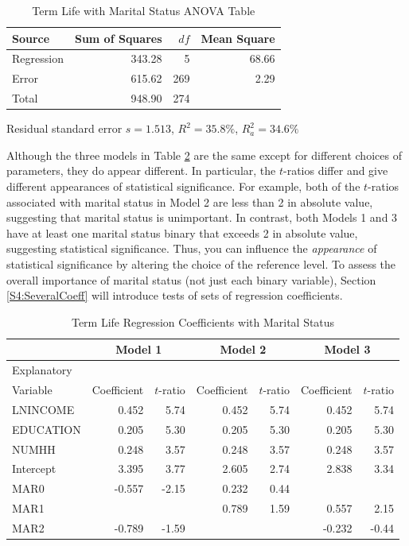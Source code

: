 
\begin{table}[h]
 \caption{\label{T4:MSTermLifeANOVA} Term Life with
Marital Status ANOVA Table}
\begin{tabular}{lrrr}
 \hline Source
& Sum of Squares & $df$ & Mean Square \\ \hline

Regression & 343.28 & 5 &   68.66 \\
Error      & 615.62 & 269 &  2.29 \\
Total      & 948.90& 274 &   \\ \hline
\end{tabular}

Residual standard error $s= 1.513$, $R^2 = 35.8\%$, $R_a^2 = 34.6\%$
\end{table}


Although the three models in Table \ref{T4:MSTermLifeRegrCoeff} are
the same except for different choices of parameters, they do appear
different. In particular, the $t$-ratios differ and give different
appearances of statistical significance. For example, both of the
$t$-ratios associated with marital status in Model 2 are less than 2
in absolute value, suggesting that marital status is unimportant. In
contrast, both Models 1 and 3 have at least one marital status
binary that exceeds 2 in absolute value, suggesting statistical
significance. Thus, you can influence the \emph{appearance} of
statistical significance by altering the choice of the reference
level. To assess the overall importance of marital status (not just
each binary variable), Section \ref{S4:SeveralCoeff} will introduce
tests of sets of regression coefficients.



\begin{table}
 \caption{\label{T4:MSTermLifeRegrCoeff} Term Life
Regression Coefficients with Marital Status}
\begin{tabular}{l|rr|rr|rr}
 \hline
 & \multicolumn{2}{c|}{Model 1}& \multicolumn{2}{c|}{Model 2}& \multicolumn{2}{c}{Model 3}\\
 \hline
 Explanatory \\
 Variable & Coefficient & $t$-ratio & Coefficient & $t$-ratio& Coefficient &
 $t$-ratio\\\hline
LNINCOME & 0.452 & 5.74 & 0.452 & 5.74 & 0.452 & 5.74 \\
EDUCATION &0.205 & 5.30 &0.205 & 5.30&0.205 & 5.30 \\
NUMHH     & 0.248 & 3.57 & 0.248 & 3.57 & 0.248 & 3.57 \\\hline
Intercept & 3.395 & 3.77  & 2.605&  2.74 & 2.838 & 3.34\\
MAR0    & -0.557 & -2.15&  0.232 &  0.44\\
MAR1 & & & 0.789 & 1.59 & 0.557 & 2.15\\
MAR2 & -0.789 & -1.59 & & & -0.232 & -0.44\\
\hline
\end{tabular}
\end{table}

